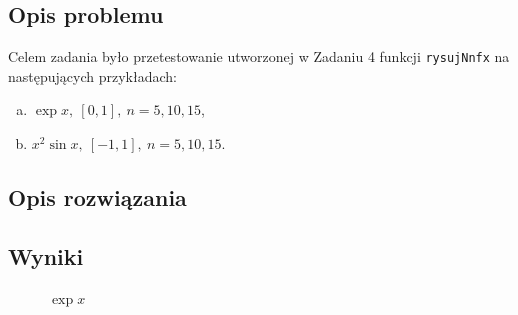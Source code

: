 \documentclass{classrep}
\begin{document}
	\subsection{Opis problemu}
		Celem zadania było przetestowanie utworzonej w Zadaniu 4 funkcji \texttt{rysujNnfx} na następujących przykładach:
			\begin{enumerate}[(a)]
				\item $\exp{x},~ [0,1],~ n = 5, 10, 15$,
				\item $x^2 \sin{x},~ [-1,1],~ n = 5, 10, 15$.
			\end{enumerate}
	\subsection{Opis rozwiązania}	
		
		
	\subsection{Wyniki}
			
		\begin{figure}[!htbp]
			\centering
			 \hfill
			 \hfill
  			\caption{$\exp{x}$}
  			\label{fig:1}
		\end{figure}		
		
\end{document}
